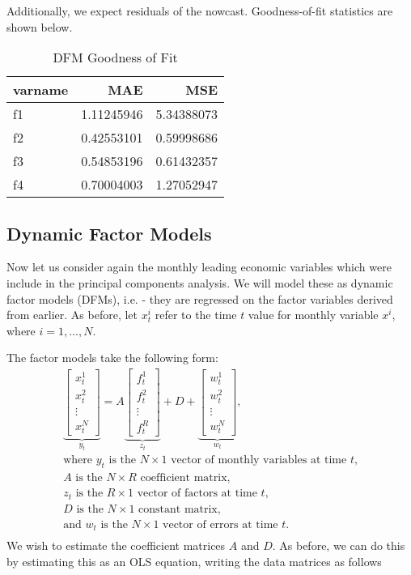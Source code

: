 \documentclass[11pt, letterpaper]{article}\usepackage[]{graphicx}\usepackage[]{color}
\begin{document}
Additionally, we expect residuals of the nowcast. Goodness-of-fit statistics are shown below.
\begin{table}[H]
\centering
\begingroup\footnotesize
\begin{tabular}{lrr}
  \hline
varname & MAE & MSE \\ 
  \hline
f1 & 1.11245946 & 5.34388073 \\ 
  f2 & 0.42553101 & 0.59998686 \\ 
  f3 & 0.54853196 & 0.61432357 \\ 
  f4 & 0.70004003 & 1.27052947 \\ 
   \hline
\end{tabular}
\endgroup
\caption{DFM Goodness of Fit} 
\end{table}




\subsection{Dynamic Factor Models}
Now let us consider again the monthly leading economic variables which were include in the principal components analysis. We will model these as dynamic factor models (DFMs), i.e. - they are regressed on the factor variables derived from earlier. As before, let $x^i_t$ refer to the time $t$ value for monthly variable $x^i$, where $i = 1, \dots, N$.

The factor models take the following form:
\begin{align*}
\underbrace{\begin{bmatrix}
	x^1_t\\
	x^2_t\\
	\vdots \\
	x^N_t
\end{bmatrix}}_{y_t}
=
A
\underbrace{\begin{bmatrix}
	f^1_{t}\\
	f^2_{t}\\
	\vdots \\
	f^R_{t}
\end{bmatrix}}_{z_t}
+
D 
+
\underbrace{\begin{bmatrix}
	w^1_t\\
	w^2_t\\
	\vdots\\
	w^N_t
\end{bmatrix}}_{w_t},\\
\text{where $y_t$ is the $N \times 1$ vector of monthly variables at time $t$,}\\
\text{$A$ is the $N \times R$ coefficient matrix,}\\
\text{$z_t$ is the $R \times 1$ vector of factors at time $t$,}\\
\text{$D$ is the $N \times 1$ constant matrix,}\\
\text{and $w_t$ is the $N \times 1$ vector of errors at time $t$.}\\
\end{align*}
We wish to estimate the coefficient matrices $A$ and $D$. As before, we can do this by estimating this as an OLS equation, writing the data matrices as follows
\end{document}

